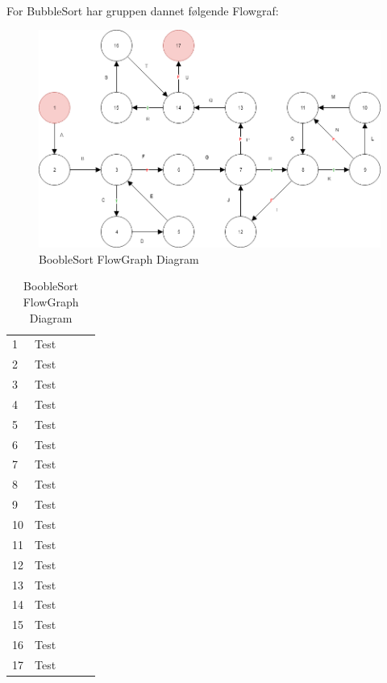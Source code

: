 \documentclass[11pt]{article}
\begin{document}
    
    \\
    \noindent
    For BubbleSort har gruppen dannet følgende Flowgraf:\\
    \begin{table}[H]
        \begin{minipage}{.7\textwidth}
            \begin{figure}[H]
            \centering
            \includegraphics[width=1\textwidth,angle=0]{Struktureret_System_Udvikling/Workshop_3/Booble_Sort_Flowgraph.png}
            \caption{BoobleSort FlowGraph Diagram}
            \label{fig:BoobleSortGraph}
            \end{figure}
        \end{minipage}
        \begin{minipage}{.3\textwidth}
            \quad
            \begin{tabular}{lllll}
                1 & Test\\
                2 & Test\\
                3 & Test\\
                4 & Test\\
                5 & Test\\
                6 & Test\\
                7 & Test\\
                8 & Test\\
                9 & Test\\
                10 & Test\\
                11 & Test\\
                12 & Test\\
                13 & Test\\
                14 & Test\\
                15 & Test\\
                16 & Test\\
                17 & Test\\
            \end{tabular}
        \end{minipage}
    \end{table}
\end{document}
